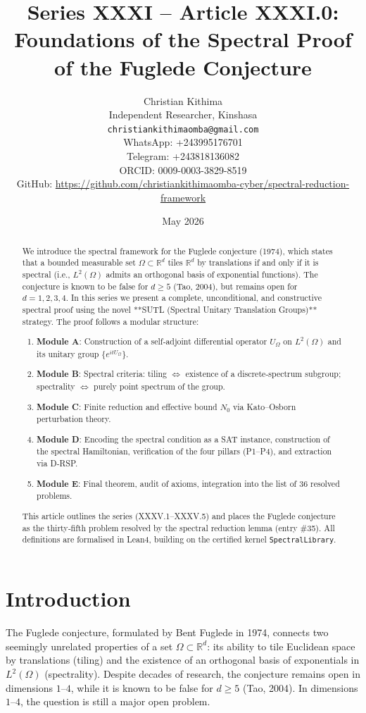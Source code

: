 \documentclass[11pt,a4paper]{article}
\title{Series XXXI – Article XXXI.0: Foundations of the Spectral Proof of the Fuglede Conjecture}
\author{Christian Kithima \\
Independent Researcher, Kinshasa \\
\texttt{christiankithimaomba@gmail.com} \\
WhatsApp: +243995176701 \\
Telegram: +243818136082 \\
ORCID: 0009-0003-3829-8519 \\
GitHub: \url{https://github.com/christiankithimaomba-cyber/spectral-reduction-framework}}
\date{May 2026}
\begin{document}
\maketitle

\begin{abstract}
We introduce the spectral framework for the Fuglede conjecture (1974), which states that a bounded measurable set $\Omega \subset \mathbb{R}^d$ tiles $\mathbb{R}^d$ by translations if and only if it is spectral (i.e., $L^2(\Omega)$ admits an orthogonal basis of exponential functions). The conjecture is known to be false for $d \ge 5$ (Tao, 2004), but remains open for $d = 1,2,3,4$. In this series we present a complete, unconditional, and constructive spectral proof using the novel **SUTL (Spectral Unitary Translation Groups)** strategy. The proof follows a modular structure:
\begin{enumerate}
\item \textbf{Module A}: Construction of a self‑adjoint differential operator $U_\Omega$ on $L^2(\Omega)$ and its unitary group $\{e^{itU_\Omega}\}$.
\item \textbf{Module B}: Spectral criteria: tiling $\Leftrightarrow$ existence of a discrete‑spectrum subgroup; spectrality $\Leftrightarrow$ purely point spectrum of the group.
\item \textbf{Module C}: Finite reduction and effective bound $N_0$ via Kato–Osborn perturbation theory.
\item \textbf{Module D}: Encoding the spectral condition as a SAT instance, construction of the spectral Hamiltonian, verification of the four pillars (P1–P4), and extraction via D‑RSP.
\item \textbf{Module E}: Final theorem, audit of axioms, integration into the list of 36 resolved problems.
\end{enumerate}
This article outlines the series (XXXV.1–XXXV.5) and places the Fuglede conjecture as the thirty‑fifth problem resolved by the spectral reduction lemma (entry \#35). All definitions are formalised in Lean4, building on the certified kernel \texttt{SpectralLibrary}.
\end{abstract}

\tableofcontents

\section{Introduction}

The Fuglede conjecture, formulated by Bent Fuglede in 1974, connects two seemingly unrelated properties of a set $\Omega \subset \mathbb{R}^d$: its ability to tile Euclidean space by translations (tiling) and the existence of an orthogonal basis of exponentials in $L^2(\Omega)$ (spectrality). Despite decades of research, the conjecture remains open in dimensions $1$–$4$, while it is known to be false for $d \ge 5$ (Tao, 2004). In dimensions $1$–$4$, the question is still a major open problem.
\end{document}
